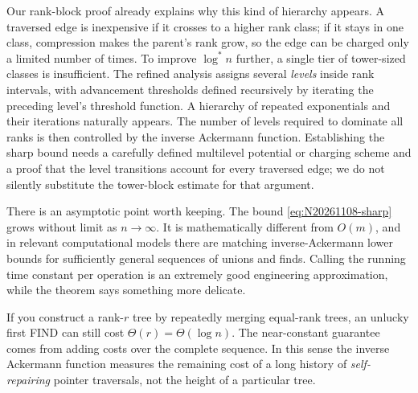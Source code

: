 Our rank-block proof already explains why this kind of hierarchy appears. A traversed edge is inexpensive if it crosses to a higher rank class; if it stays in one class, compression makes the parent's rank grow, so the edge can be charged only a limited number of times. To improve \(\log^*n\) further, a single tier of tower-sized classes is insufficient. The refined analysis assigns several \emph{levels} inside rank intervals, with advancement thresholds defined recursively by iterating the preceding level's threshold function. A hierarchy of repeated exponentials and their iterations naturally appears. The number of levels required to dominate all ranks is then controlled by the inverse Ackermann function. Establishing the sharp bound needs a carefully defined multilevel potential or charging scheme and a proof that the level transitions account for every traversed edge; we do not silently substitute the tower-block estimate for that argument.

There is an asymptotic point worth keeping. The bound \eqref{eq:N20261108-sharp} grows without limit as \(n\to\infty\). It is mathematically different from \(O(m)\), and in relevant computational models there are matching inverse-Ackermann lower bounds for sufficiently general sequences of unions and finds. Calling the running time constant per operation is an extremely good engineering approximation, while the theorem says something more delicate.

If you construct a rank-\(r\) tree by repeatedly merging equal-rank trees, an unlucky first FIND can still cost \(\Theta(r)=\Theta(\log n)\). The near-constant guarantee comes from adding costs over the complete sequence. In this sense the inverse Ackermann function measures the remaining cost of a long history of \emph{self-repairing} pointer traversals, not the height of a particular tree.
